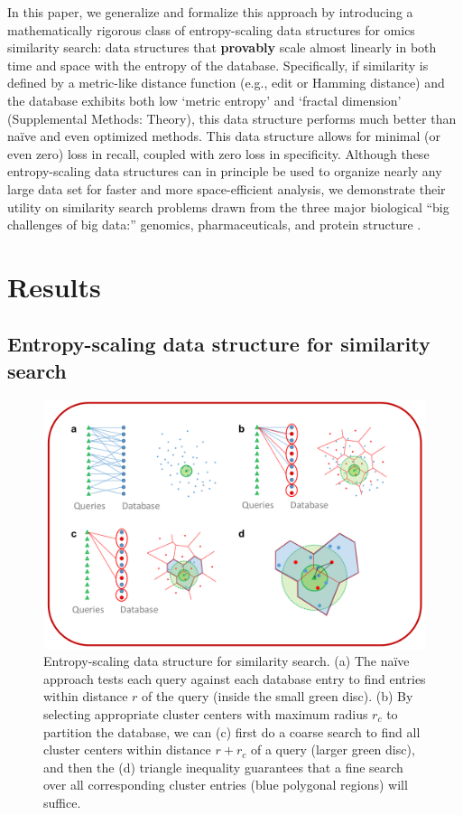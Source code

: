 \documentclass[review,preprint,12pt]{elsarticle}
\renewcommand{\cite}{\citep} %
\theoremstyle{definition}
\theoremstyle{remark}
\numberwithin{equation}{section}
\begin{document}
In this paper, we generalize and formalize this approach by introducing 
a mathematically rigorous class of entropy-scaling data structures for 
omics similarity search: data structures that \textbf{provably} scale almost linearly in both time and space with the entropy of the database.
Specifically, if similarity is defined by a metric-like distance function (e.g., edit or Hamming distance) and the database exhibits both low `metric entropy' and `fractal dimension' (Supplemental Methods: Theory), this data structure performs much better than na\"ive and even optimized methods.
This data structure allows for minimal (or even zero) loss in recall, coupled
with zero loss in specificity.
Although these entropy-scaling data structures can in principle be used to organize nearly any large data set for faster and more space-efficient analysis,
we demonstrate their utility on similarity search problems drawn from the three major biological ``big challenges of big data:'' genomics, pharmaceuticals, and protein structure \cite{marx2013biology}.

\section{Results}
\subsection{Entropy-scaling data structure for similarity search}
\begin{figure}[p]
    \centering
    \centerline{\includegraphics[width=8in]{assets/dataStructure.png}}
    \caption{ Entropy-scaling data structure for similarity search. %
            (a) The na\"ive approach tests each query against each database entry to find entries within distance $r$ of the query (inside the small green disc). %
            (b) By selecting appropriate cluster centers with maximum radius $r_c$ to partition the database, we can (c) first do a coarse search to find all cluster centers within distance $r+r_c$ of a query (larger green disc), %
 and then the (d) triangle inequality guarantees that a fine search over all corresponding cluster entries (blue polygonal regions) will suffice.}
    \label{fig:dataStructure}
\end{figure}
\end{document}

